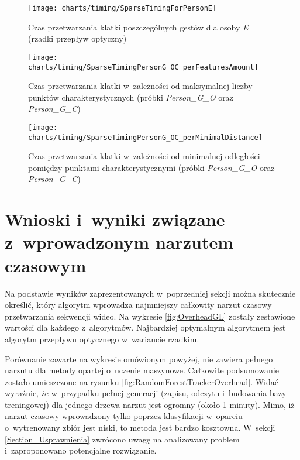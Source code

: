     \begin{figure}[!ht]
      \centering
      \texttt{[image: charts/timing/SparseTimingForPersonE]}
      \caption[Czas przetwarzania klatki poszczególnych gestów dla osoby E]
              {Czas przetwarzania klatki poszczególnych gestów dla osoby \textit{E}\\(rzadki przepływ optyczny)}
      \label{fig:SparseTimingForPersonE}
    \end{figure}

    \newpage
    \begin{figure}[!ht]
      \centering
      \texttt{[image: charts/timing/SparseTimingPersonG\_OC\_perFeaturesAmount]}
      \caption[Czas przetwarzania klatki w~zależności od maksymalnej liczby punktów charakterystycznych]
              {Czas przetwarzania klatki w~zależności od maksymalnej liczby punktów charakterystycznych (próbki \textit{Person\_G\_O} oraz \textit{Person\_G\_C})}
      \label{fig:TimingPerFeaturesAmount}
    \end{figure}

    \begin{figure}[!ht]
      \centering
      \texttt{[image: charts/timing/SparseTimingPersonG\_OC\_perMinimalDistance]}
      \caption[Czas przetwarzania klatki w~zależności od minimalnej odległości pomiędzy punktami charakterystycznymi]
              {Czas przetwarzania klatki w~zależności od minimalnej odległości pomiędzy punktami charakterystycznymi (próbki \textit{Person\_G\_O} oraz \textit{Person\_G\_C})}
      \label{fig:TimingPerMinimalDistance}
    \end{figure}

  \section{Wnioski i~wyniki związane z~wprowadzonym narzutem czasowym}\label{Section_Overhead}
    Na podstawie wyników zaprezentowanych w~poprzedniej sekcji można skutecznie określić, który algorytm wprowadza najmniejszy całkowity narzut czasowy przetwarzania sekwencji wideo. Na wykresie \ref{fig:OverheadGL} zostały zestawione wartości dla każdego z~algorytmów. Najbardziej optymalnym algorytmem jest algorytm przepływu optycznego w~wariancie rzadkim.

    Porównanie zawarte na wykresie omówionym powyżej, nie zawiera pełnego narzutu dla metody opartej o~uczenie maszynowe. Całkowite podsumowanie zostało umieszczone na rysunku \ref{fig:RandomForestTrackerOverhead}. Widać wyraźnie, że w~przypadku pełnej generacji (zapisu, odczytu i~budowania bazy treningowej) dla jednego drzewa narzut jest ogromny (około 1 minuty). Mimo, iż narzut czasowy wprowadzony tylko poprzez klasyfikacji w~oparciu o~wytrenowany zbiór jest niski, to metoda jest bardzo kosztowna. W~sekcji \ref{Section_Usprawnienia} zwrócono uwagę na analizowany problem i~zaproponowano potencjalne rozwiązanie.

